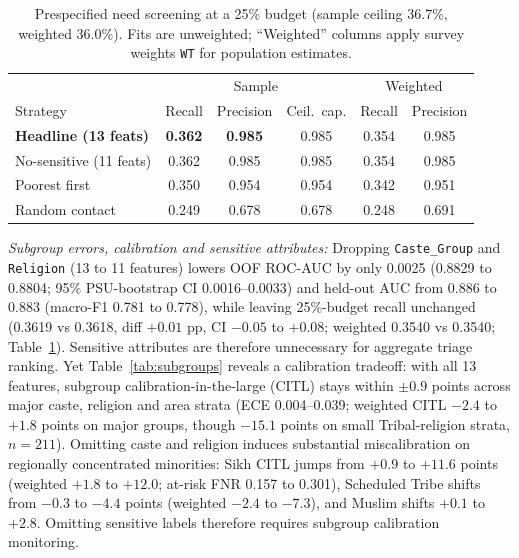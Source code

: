 \documentclass[conference]{IEEEtran}
\begin{document}
\begin{table}[t]
    \centering
    \caption{Prespecified need screening at a 25\% budget (sample ceiling 36.7\%, weighted 36.0\%). Fits are unweighted; ``Weighted'' columns apply survey weights \texttt{WT} for population estimates.}
    \label{tab:targeting}
    \footnotesize
    \setlength{\tabcolsep}{3pt}
    \begin{tabular}{l c c c c c}
        \toprule
        & \multicolumn{3}{c}{Sample} & \multicolumn{2}{c}{Weighted} \\
        Strategy & Recall & Precision & Ceil.\ cap. & Recall & Precision \\
        \midrule
        \textbf{Headline (13 feats)} & \textbf{0.362} & \textbf{0.985} & 0.985 & 0.354 & 0.985 \\
        No-sensitive (11 feats) & 0.362 & 0.985 & 0.985 & 0.354 & 0.985 \\
        Poorest first & 0.350 & 0.954 & 0.954 & 0.342 & 0.951 \\
        Random contact & 0.249 & 0.678 & 0.678 & 0.248 & 0.691 \\
        \bottomrule
    \end{tabular}
\end{table}

\emph{Subgroup errors, calibration and sensitive attributes:} Dropping \texttt{Caste\_Group} and \texttt{Religion} (13 to 11 features) lowers OOF ROC-AUC by only 0.0025 (0.8829 to 0.8804; 95\% PSU-bootstrap CI 0.0016--0.0033) and held-out AUC from 0.886 to 0.883 (macro-F1 0.781 to 0.778), while leaving 25\%-budget recall unchanged (0.3619 vs 0.3618, diff $+0.01$ pp, CI $-0.05$ to $+0.08$; weighted 0.3540 vs 0.3540; Table~\ref{tab:targeting}). Sensitive attributes are therefore unnecessary for aggregate triage ranking. Yet Table~\ref{tab:subgroups} reveals a calibration tradeoff: with all 13 features, subgroup calibration-in-the-large (CITL) stays within $\pm 0.9$ points across major caste, religion and area strata (ECE 0.004--0.039; weighted CITL $-2.4$ to $+1.8$ points on major groups, though $-15.1$ points on small Tribal-religion strata, $n=211$). Omitting caste and religion induces substantial miscalibration on regionally concentrated minorities: Sikh CITL jumps from $+0.9$ to $+11.6$ points (weighted $+1.8$ to $+12.0$; at-risk FNR 0.157 to 0.301), Scheduled Tribe shifts from $-0.3$ to $-4.4$ points (weighted $-2.4$ to $-7.3$), and Muslim shifts $+0.1$ to $+2.8$. Omitting sensitive labels therefore requires subgroup calibration monitoring.
\end{document}
